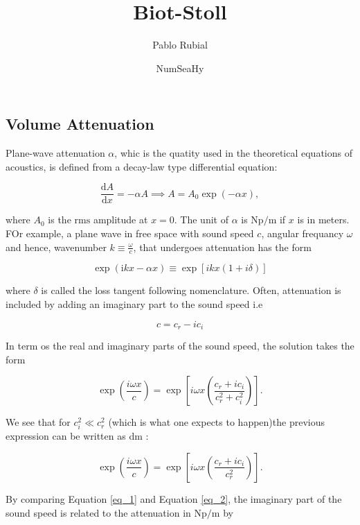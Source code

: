 \documentclass{article}[a4paper, 12pt]
\title{Biot-Stoll}
\author{Pablo Rubial}
\date{NumSeaHy}
\begin{document}
\maketitle

\subsection*{Volume Attenuation}

Plane-wave attenuation $\alpha$, whic is the quatity used in the theoretical equations of acoustics, is defined from a decay-law type differential equation:

$$
\frac{\mathrm{d} A} {\mathrm{d} x}=-\alpha A \implies A=A_{0} \operatorname{e x p} (-\alpha x ),
$$

where $A_0$ is the $\mathrm{rms}$ amplitude at $x=0$. The unit of $\alpha$ is $\mathrm{Np}/\mathrm{m}$ if $x$ is in meters. FOr example, a plane wave in free space with sound speed $c$, angular frequancy $\omega$ and hence, wavenumber $k \equiv  \frac{\omega}{c}$, that undergoes attenuation has the form 

\begin{equation}\label{eq_1}
    \exp( \mathrm{i} k x-\alpha x ) \equiv\exp\left[ i k x ( 1+i \delta) \right]
\end{equation}

where $\delta$ is called the loss tangent following \cite{jensen2011computational} nomenclature. Often, attenuation is included by adding an imaginary part to the sound speed i.e

$$c = c_r - ic_i$$

In term os the real and imaginary parts of the sound speed, the solution takes the form

$$
\exp\left( {\frac{i \omega x} {c}} \right)=\exp\left[ i \omega x \left( {\frac{c_{r}+i c_{i}} {c_{r}^{2}+c_{i}^{2}}} \right) \right].
$$

We see that for $c_i^2 \ll c_r^2$ (which is what one expects to happen)the previous expression can be written as dm  :

\begin{equation}\label{eq_2}
    \exp\left( {\frac{i \omega x} {c}} \right)=\exp\left[ i \omega x \left( {\frac{c_{r}+i c_{i}} {c_{r}^{2}}} \right) \right].
\end{equation}

By comparing Equation \eqref{eq_1} and Equation \eqref{eq_2}, the imaginary part of the sound speed is related to the attenuation in $\mathrm{Np}/\mathrm{m}$ by 
\end{document}
